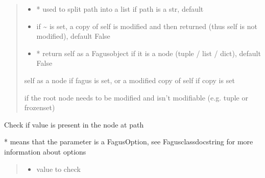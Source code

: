 \documentclass[a4paper,10pt,english]{sphinxmanual}
\begin{document}
\begin{fulllineitems}
\begin{fulllineitems}
\begin{quote}
\begin{description}
\begin{itemize}
\item {}
\sphinxAtStartPar
{} \textendash{} * used to split path into a list if path is a str, default 

\item {}
\sphinxAtStartPar
{} \textendash{} if \textasciitilde{} is set, a copy of self is modified and then returned (thus self is not modified), default False

\item {}
\sphinxAtStartPar
{} \textendash{} * return self as a Fagus\sphinxhyphen{}object if it is a node (tuple / list / dict), default False

\end{itemize}

\sphinxAtStartPar
self as a node if fagus is set, or a modified copy of self if copy is set

\sphinxAtStartPar
{} \textendash{} if the root node needs to be modified and isn’t modifiable (e.g. tuple or frozenset)

\end{description}\end{quote}

\end{fulllineitems}


\begin{fulllineitems}
\label{\detokenize{fagus.fagus:fagus.fagus.Fagus.contains}}
\pysigstartsignatures
{}
\pysigstopsignatures
\sphinxAtStartPar
Check if value is present in the node at path

\sphinxAtStartPar
* means that the parameter is a FagusOption, see Fagus\sphinxhyphen{}class\sphinxhyphen{}docstring for more information about options
\begin{quote}\begin{description}
\begin{itemize}
\item {}
\sphinxAtStartPar
{} \textendash{} value to check


\end{itemize}
\end{description}
\end{quote}
\end{fulllineitems}
\end{fulllineitems}
\end{document}
